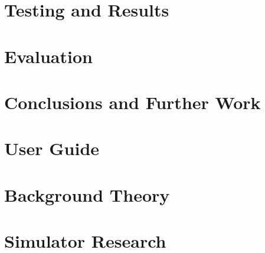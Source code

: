 \documentclass[11pt,a4paper,twoside,openright]{report}
\begin{document}
\chapter{Testing and Results}



\chapter{Evaluation}



\chapter{Conclusions and Further Work}
%


\chapter{User Guide}



\newpage


\begin{appendices}
\appendix
\chapter{Background Theory}

\chapter{Simulator Research}



\end{appendices}
\end{document}
